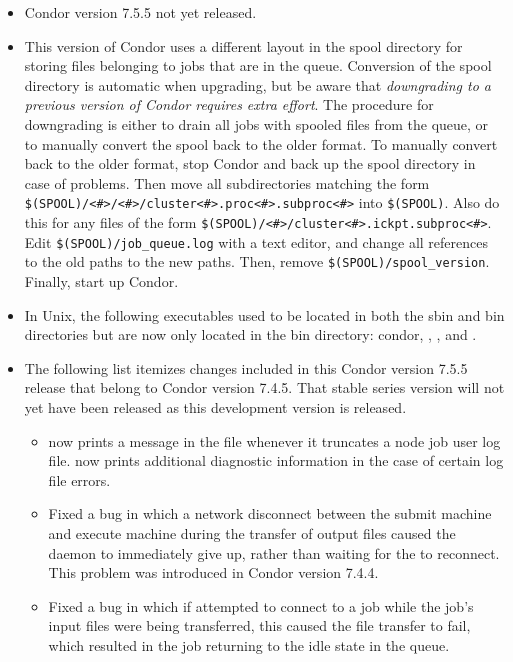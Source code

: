 \begin{itemize}

\item Condor version 7.5.5 not yet released.

\item This version of Condor uses a different layout in the spool
  directory for storing files belonging to jobs that are in the queue.
  Conversion of the spool directory is automatic when upgrading, but
  be aware that \emph{downgrading to a previous version of Condor
  requires extra effort}.  The procedure for downgrading is either
  to drain all jobs with spooled files from the queue, or to manually
  convert the spool back to the older format.  To manually convert
  back to the older format, stop Condor and back up the spool directory
  in case of problems.  Then move all subdirectories matching the form
  \verb|$(SPOOL)/<#>/<#>/cluster<#>.proc<#>.subproc<#>| into
  \verb|$(SPOOL)|.  Also do this for any files of the form
  \verb|$(SPOOL)/<#>/cluster<#>.ickpt.subproc<#>|.  Edit
  \verb|$(SPOOL)/job_queue.log| with a text editor, and change all
  references to the old paths to the new paths.  Then, remove
  \verb|$(SPOOL)/spool_version|.  Finally, start up Condor.

\item In Unix, the following executables used to be located in both
  the sbin and bin directories but are now only located in the bin
  directory: condor, , , and
  .

\item The following list itemizes changes included in this Condor version
  7.5.5 release that belong to Condor version 7.4.5.  That stable series
  version will not yet have been released as this development version 
  is released.
  \begin{itemize}

  \item {} now prints a message in the  file
  whenever it truncates a node job user log file.
   now prints additional diagnostic information in the
  case of certain log file errors.

  \item Fixed a bug in which
  a network disconnect between the submit machine and execute
  machine during the transfer of output files caused the
   daemon to immediately give up, rather than waiting
  for the  to reconnect.  This problem was introduced
  in Condor version 7.4.4.

  \item Fixed a bug in which
  if  attempted to connect to a job while the
  job's input files were being transferred, this caused the file
  transfer to fail, which resulted in the job returning to the idle
  state in the queue.

  \end{itemize}
\end{itemize}


